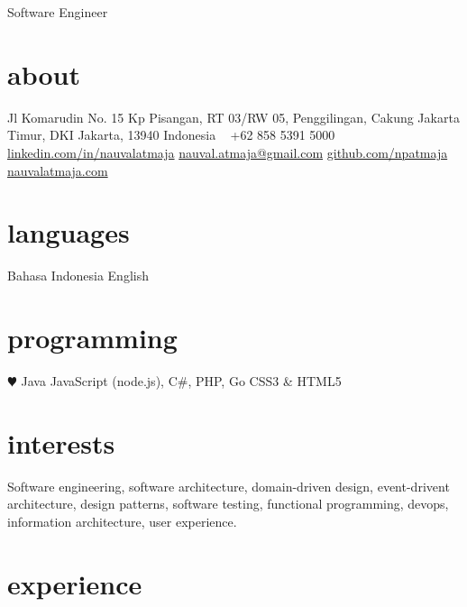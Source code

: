 \documentclass[]{friggeri-cv}
\begin{document}
       {Software Engineer}


\begin{aside}
  \section{about}
  	Jl Komarudin No. 15
  	Kp Pisangan, RT 03/RW 05,
  	Penggilingan, Cakung
  	Jakarta Timur,
  	DKI Jakarta, 13940
  	Indonesia
    ~
    +62 858 5391 5000
    ~
    \href{https://www.linkedin.com/in/nauvalatmaja/}{linkedin.com/in/nauvalatmaja}
    \href{mailto:nauval.atmaja@gmail.com}{nauval.atmaja@gmail.com}
    \href{https://github.com/npatmaja}{github.com/npatmaja}
    \href{http://nauvalatmaja.com}{nauvalatmaja.com}
  \section{languages}
  	Bahasa Indonesia
  	English
  \section{programming}
    {\color{red} $\varheartsuit$} Java
	JavaScript (node.js), C\#, PHP, Go
    CSS3 \& HTML5
\end{aside}

\section{interests}

Software engineering, software architecture, domain-driven design, event-drivent architecture,
design patterns, software testing, functional programming, devops, information architecture,
user experience.

\section{experience}
\end{document}
